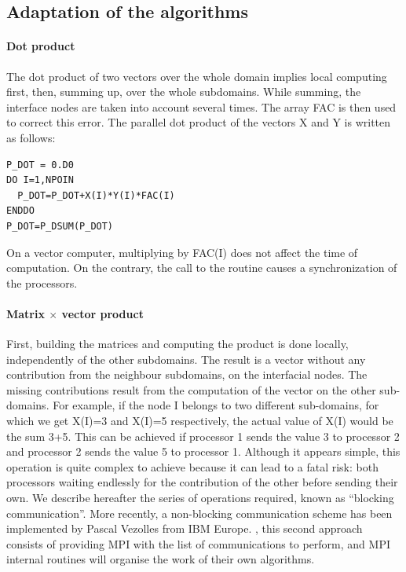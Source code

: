 \subsection{Adaptation of the algorithms}

\paragraph{Dot product}

The dot product of two vectors over the whole domain implies local computing
first, then, summing up, over the whole subdomains. While summing, the interface
nodes are taken into account several times. The array FAC is then used to
correct this error. The parallel dot product  of the vectors X
and Y is written as follows:

\begin{lstlisting}[language=TelFortran]
P_DOT = 0.D0
DO I=1,NPOIN
  P_DOT=P_DOT+X(I)*Y(I)*FAC(I)
ENDDO
P_DOT=P_DSUM(P_DOT)
\end{lstlisting}

On a vector computer, multiplying by FAC(I) does not affect the time of
computation. On the contrary, the call to the  routine causes a
synchronization of the processors.

\paragraph{Matrix $\times$ vector product}

First, building the matrices and computing the product is done locally,
independently of the other subdomains. The result is a vector without any
contribution from the neighbour subdomains, on the interfacial nodes. The
missing contributions result from the computation of the vector on the other
sub-domains. For example, if the node I belongs to two different sub-domains,
for which we get X(I)=3 and X(I)=5 respectively, the actual value of X(I) would
be the sum 3+5. This can be achieved if processor 1 sends the value 3 to
processor 2 and processor 2 sends the value 5 to processor 1. Although it
appears simple, this operation is quite complex to achieve because it can lead
to a fatal risk: both processors waiting endlessly for the contribution of the
other before sending their own. We describe hereafter the series of operations
required, known as ``blocking communication''. More recently, a non-blocking
communication scheme has been implemented by Pascal Vezolles from IBM Europe.
, this second approach consists of providing MPI with the list of
communications to perform, and MPI internal routines will organise the work
of their own algorithms.


